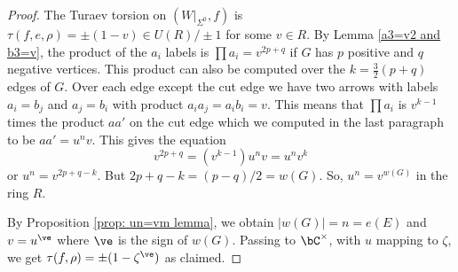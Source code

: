 \begin{proof}
The Turaev torsion on $(W|_{\Sigma^0},f)$ is $\tau(f,e,\rho)=\pm(1-v)\in U(R)/\pm 1$ for some $v\in R$. By Lemma \ref{a3=v2 and b3=v}, the product of the $a_i$ labels is $\prod a_i=v^{2p+q}$ if $G$ has $p$ positive and $q$ negative vertices. This product can also be computed over the $k=\frac32(p+q)$ edges of $G$. Over each edge except the cut edge we have two arrows with labels $a_i=b_j$ and $a_j=b_i$ with product $a_ia_j=a_ib_i=v$. This means that $\prod a_i$ is $v^{k-1}$ times the product $aa'$ on the cut edge which we computed in the last paragraph to be $a a'=u^nv$. This gives the equation
\[
v^{2p+q}=(v^{k-1})u^nv=u^nv^k
\]
or $u^n=v^{2p+q-k}$. But $2p+q-k=(p-q)/2=w(G)$. So, $u^n=v^{w(G)}$ in the ring $R$.

By Proposition \ref{prop: un=vm lemma}, we obtain $|w(G)|=n=e(E)$ and $v=u^{\ve}$ where $\ve$ is the sign of $w(G)$. Passing to $\bC^\times$, with $u$ mapping to $\zeta$, we get $\tau(f,\rho)=\pm(1-\zeta^\ve)$ as claimed.
\end{proof}

